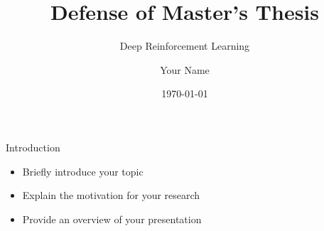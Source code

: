\documentclass{beamer}
\title{Defense of Master's Thesis}
\subtitle{Deep Reinforcement Learning}
\author{Your Name}
\institute{Your University}
\date{\today}
\begin{document}
\begin{frame}
  \titlepage
\end{frame}

\begin{frame}{Introduction}

  \begin{itemize}
    \item Briefly introduce your topic
    \item Explain the motivation for your research
    \item Provide an overview of your presentation
  \end{itemize}

\end{frame}

\end{document}
